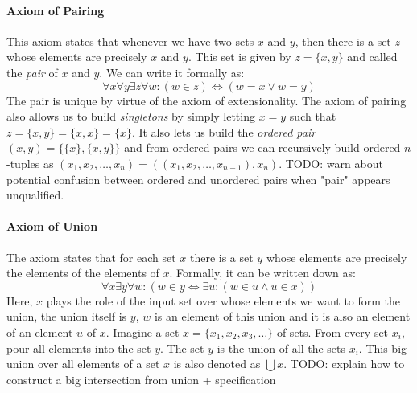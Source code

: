 \paragraph{Axiom of Pairing}
This axiom states that whenever we have two sets $x$ and $y$, then there is a set $z$ whose elements are precisely $x$ and $y$. This set is given by $z = \{x, y\}$ and called the \emph{pair} of $x$ and $y$. We can write it formally as:
\begin{equation}
\forall x \forall y \exists z \forall w: (w \in z) \Leftrightarrow (w = x \vee w = y)
\end{equation}
The pair is unique by virtue of the axiom of extensionality. The axiom of pairing also allows us to build \emph{singletons} by simply letting $x = y$ such that  $z = \{x, y\} = \{x, x\} = \{x\}$. It also lets us build the \emph{ordered pair} $(x,y) = \{ \{x\}, \{x, y\} \}$ and from ordered pairs we can recursively build ordered $n$-tuples as $(x_1, x_2, \ldots, x_n) = ((x_1, x_2, \ldots, x_{n-1}), x_n)$. TODO: warn about potential confusion between ordered and unordered pairs when "pair" appears unqualified.




\paragraph{Axiom of Union}
The axiom states that for each set $x$ there is a set $y$ whose elements are precisely the elements of the elements of $x$. Formally, it can be written down as:
\begin{equation}
\forall x \exists y \forall w:
(w \in y \Leftrightarrow \exists u:(w \in u \wedge u \in x )  )
\end{equation}
Here, $x$ plays the role of the input set over whose elements we want to form the union, the union itself is $y$, $w$ is an element of this union and it is also an element of an element $u$ of $x$. Imagine a set $x = \{ x_1, x_2, x_3, \ldots \} $ of sets. From every set $x_i$, pour all elements into the set $y$. The set $y$ is the union of all the sets $x_i$. This big union over all elements of a set $x$ is also denoted as $\bigcup x$. TODO: explain how to construct a big intersection from union + specification

